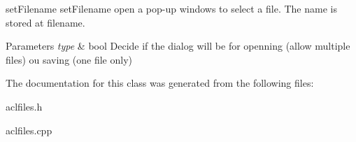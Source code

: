 set\+Filename set\+Filename open a pop-\/up windows to select a file. The name is stored at filename. 


\begin{DoxyParams}{Parameters}
{\em type} & bool Decide if the dialog will be for openning (allow multiple files) ou saving (one file only) \\
\hline
\end{DoxyParams}


The documentation for this class was generated from the following files\+:\begin{DoxyCompactItemize}
\item 
aclfiles.\+h\item 
aclfiles.\+cpp\end{DoxyCompactItemize}
